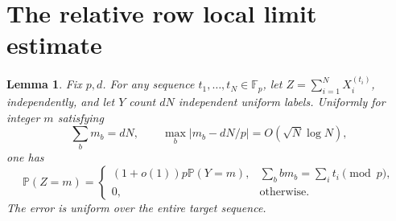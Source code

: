 \documentclass[11pt]{article}
\newtheorem{lemma}{Lemma}
\newcommand{\Fp}{\mathbb F_p}
\newcommand{\Prob}{\mathbb P}
\begin{document}
\section{The relative row local limit estimate}
\begin{lemma}\label{lem:row}
Fix $p,d$. For any sequence $t_1,\ldots,t_N\in\Fp$, let
$Z=\sum_{i=1}^NX_i^{(t_i)}$, independently, and let $Y$ count $dN$
independent uniform labels. Uniformly for integer $m$ satisfying
\[
 \sum_bm_b=dN,\qquad
 \max_b|m_b-dN/p|=O(\sqrt N\log N),
\]
one has
\[
 \Prob(Z=m)=
 \begin{cases}
 (1+o(1))p\Prob(Y=m),&\sum_bbm_b=\sum_it_i\pmod p,\\
 0,&\text{otherwise}.
 \end{cases}
\]
The error is uniform over the entire target sequence.
\end{lemma}
\end{document}
